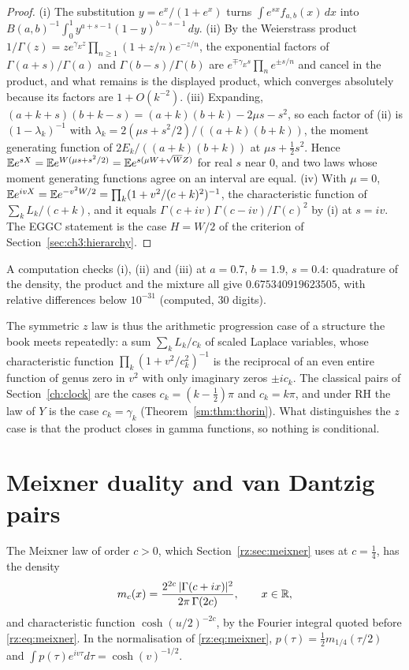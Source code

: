 \begin{proof}
(i) The substitution $y=e^x/(1+e^x)$ turns $\int e^{sx}f_{a,b}(x)\,dx$ into $B(a,b)^{-1}\int_0^1y^{a+s-1}(1-y)^{b-s-1}\,dy$. (ii) By the Weierstrass product $1/\Gamma(z)=ze^{\gamma_Ez}\prod_{n\ge1}(1+z/n)e^{-z/n}$, the exponential factors of $\Gamma(a+s)/\Gamma(a)$ and $\Gamma(b-s)/\Gamma(b)$ are $e^{\mp\gamma_Es}\prod_n e^{\pm s/n}$ and cancel in the product, and what remains is the displayed product, which converges absolutely because its factors are $1+O(k^{-2})$. (iii) Expanding, $(a+k+s)(b+k-s)=(a+k)(b+k)-2\mu s-s^2$, so each factor of (ii) is $(1-\lambda_k)^{-1}$ with $\lambda_k=2(\mu s+s^2/2)/((a+k)(b+k))$, the moment generating function of $2E_k/((a+k)(b+k))$ at $\mu s+\frac12s^2$. Hence $\mathbb{E} e^{sX}=\mathbb{E} e^{W(\mu s+s^2/2)}=\mathbb{E} e^{s(\mu W+\sqrt WZ)}$ for real $s$ near $0$, and two laws whose moment generating functions agree on an interval are equal. (iv) With $\mu=0$, $\mathbb{E} e^{ivX}=\mathbb{E} e^{-v^2W/2}=\prod_k(1+v^2/(c+k)^2)^{-1}$, the characteristic function of $\sum_kL_k/(c+k)$, and it equals $\Gamma(c+iv)\Gamma(c-iv)/\Gamma(c)^2$ by (i) at $s=iv$. The EGGC statement is the case $H=W/2$ of the criterion of Section~\ref{sec:ch3:hierarchy}.
\end{proof}

A computation checks (i), (ii) and (iii) at $a=0.7$, $b=1.9$, $s=0.4$: quadrature of the density, the product and the mixture all give $0.675340919623505$, with relative differences below $10^{-31}$ (computed, 30 digits).

The symmetric $z$ law is thus the arithmetic progression case of a structure the book meets repeatedly: a sum $\sum_kL_k/c_k$ of scaled Laplace variables, whose characteristic function $\prod_k(1+v^2/c_k^2)^{-1}$ is the reciprocal of an even entire function of genus zero in $v^2$ with only imaginary zeros $\pm ic_k$. The classical pairs of Section~\ref{ch:clock} are the cases $c_k=(k-\frac12)\pi$ and $c_k=k\pi$, and under RH the law of $Y$ is the case $c_k=\gamma_k$ (Theorem~\ref{sm:thm:thorin}). What distinguishes the $z$ case is that the product closes in gamma functions, so nothing is conditional.

\section{Meixner duality and van Dantzig pairs}\label{zdist:sec:dual}

The Meixner law of order $c>0$, which Section~\ref{rz:sec:meixner} uses at $c=\frac14$, has the density
\[
m_c(x)=\frac{2^{2c}\,|\Gamma(c+ix)|^2}{2\pi\,\Gamma(2c)},\qquad x\in\mathbb{R},
\]
and characteristic function $\cosh(u/2)^{-2c}$, by the Fourier integral quoted before \eqref{rz:eq:meixner}. In the normalisation of \eqref{rz:eq:meixner}, $p(\tau)=\frac12m_{1/4}(\tau/2)$ and $\int p(\tau)e^{iv\tau}d\tau=\cosh(v)^{-1/2}$.

